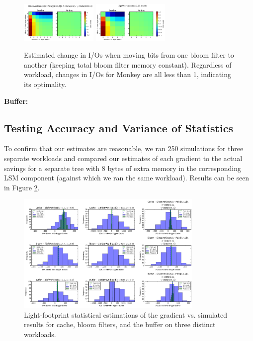 \documentclass{sig-alternate-05-2015}
\begin{document}
\begin{figure}[!htb]
\begin{center}
\includegraphics[width=0.33\textwidth]{bloom-moves-disc.png}
\includegraphics[width=0.33\textwidth]{bloom-moves-zipf.png}
\end{center}
\caption{Estimated change in I/Os when moving bits from one bloom filter to another (keeping total bloom filter memory constant). Regardless of workload, changes in I/Os for Monkey are all less than 1, indicating its optimality.}
\label{fig:bloom-realloc}
\end{figure}

\textbf{Buffer:}

\subsection{Testing Accuracy and Variance of Statistics}

To confirm that our estimates are reasonable, we ran 250 simulations for three
separate workloads and compared our estimates of each gradient to the actual
savings for a separate tree with 8 bytes of extra memory in the corresponding
LSM component (against which we ran the same workload). Results can be seen in
Figure \ref{fig:savings}.

\begin{figure}[!h]
\begin{center}
\includegraphics[width=0.8\textwidth]{all-savings.png}
\end{center}
\caption{Light-footprint statistical estimations of the gradient vs. simulated
results for cache, bloom filters, and the buffer on three distinct workloads.}
\label{fig:savings}
\end{figure}
\end{document}
